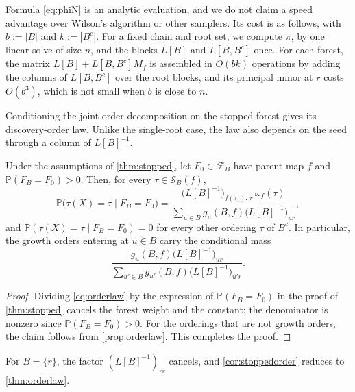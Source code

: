 \documentclass[onefignum,onetabnum]{siamart250211}
\numberwithin{theorem}{section}
\numberwithin{equation}{section}
\newcommand{\Orders}{\mathcal{S}}
\newcommand{\Fset}{\mathcal{F}}
\newcommand{\pr}{\mathbb{P}}
\begin{document}
\begin{remark}\label{rem:cost}
Formula \eqref{eq:phiN} is an analytic evaluation, and we do not claim a
speed advantage over Wilson's algorithm or other samplers. Its cost is
as follows, with $b:=|B|$ and $k:=|B^c|$. For a fixed chain and root set,
we compute $\pi$, by one linear solve of size $n$, and the blocks
$L[B]$ and $L[B,B^c]$ once. For each forest, the matrix
$L[B]+L[B,B^c]M_f$ is assembled in $O(bk)$ operations by adding the
columns of $L[B,B^c]$ over the root blocks, and its principal minor at
$r$ costs $O(b^3)$, which is not small when $b$ is close to $n$.
\end{remark}

Conditioning the joint order decomposition on the stopped forest
gives its discovery-order law. Unlike the single-root case, the law
also depends on the seed through a column of $L[B]^{-1}$.

\begin{corollary}\label{cor:stoppedorder}
Under the assumptions of \cref{thm:stopped}, let $F_0\in\Fset_B$ have
parent map $f$ and $\pr(F_B=F_0)>0$. Then, for every
$\tau\in\Orders_B(f)$,
\[
\pr\big(\tau(X)=\tau\mid F_B=F_0\big)
=\frac{\big(L[B]^{-1}\big)_{f(\tau_1),\,r}\,\omega_f(\tau)}
{\sum_{u\in B}g_u(B,f)\big(L[B]^{-1}\big)_{ur}},
\]
and $\pr(\tau(X)=\tau\mid F_B=F_0)=0$ for every other ordering $\tau$ of
$B^c$. In particular, the growth orders entering at $u\in B$ carry the
conditional mass
\[
\frac{g_u(B,f)\big(L[B]^{-1}\big)_{ur}}
{\sum_{u'\in B}g_{u'}(B,f)\big(L[B]^{-1}\big)_{u'r}} .
\]
\end{corollary}

\begin{proof}
Dividing \eqref{eq:orderlaw} by the expression of $\pr(F_B=F_0)$ in the
proof of \cref{thm:stopped} cancels the forest weight and the constant;
the denominator is nonzero since $\pr(F_B=F_0)>0$. For the orderings
that are not growth orders, the claim follows from \cref{prop:orderlaw}.
This completes the proof.
\end{proof}

For $B=\{r\}$, the factor $(L[B]^{-1})_{rr}$ cancels, and
\cref{cor:stoppedorder} reduces to \cref{thm:orderlaw}.
\end{document}
